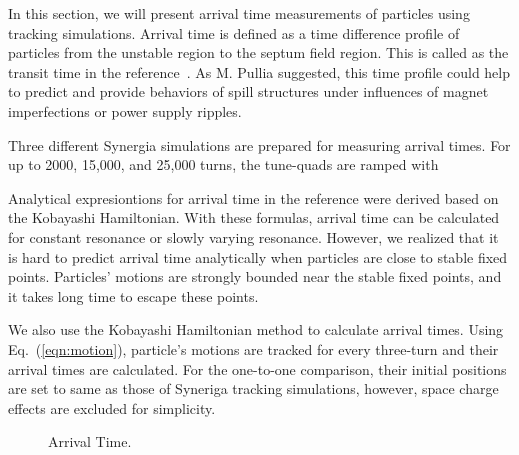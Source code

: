 \documentclass[aps,prstab,onecolumn,preprint,endfloats,11pt]{revtex4-1}
\begin{document}
In this section, we will present arrival time measurements of particles using 
tracking simulations. Arrival time is defined as a time difference profile of 
particles from the unstable region to the septum field region. This is 
called as the transit time in the reference~\cite{pullia}. As M. Pullia 
suggested, this time profile could help to predict and provide behaviors of 
spill structures under influences of magnet imperfections or power supply 
ripples.

Three different Synergia simulations are prepared for measuring arrival times. 
For up to 2000, 15,000, and 25,000 turns, the tune-quads are ramped with 




Analytical expresiontions for arrival time in the reference \cite{pullia} were 
derived based on the Kobayashi Hamiltonian. With these formulas, arrival time 
can be calculated for constant resonance or slowly varying resonance. 
However, we realized that it is hard to predict arrival time analytically when 
particles are close to stable fixed points. Particles' motions are strongly 
bounded near the stable fixed points, and it takes long time to escape these 
points.

We also use the Kobayashi Hamiltonian method to calculate arrival times. Using 
Eq.~(\ref{eqn:motion}), particle's motions are tracked for every three-turn 
and their arrival times are calculated. For the one-to-one comparison, their 
initial positions are set to same as those of Syneriga tracking simulations, 
however, space charge effects are excluded for simplicity. 




\begin{figure}[!tbp]
  \caption{\label{fig:arrival3}Arrival Time.}
\end{figure}
\end{document}
